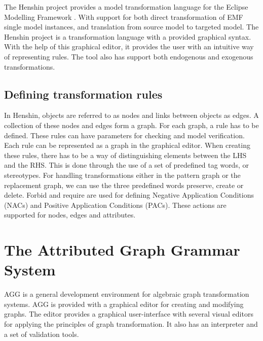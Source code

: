 \documentclass[pdftex,11pt,a4paper]{article}
\begin{document}
The Henshin project\cite{Henshin} provides a model transformation language for the Eclipse
Modelling Framework \cite{Steinberg2009}. With support for both direct 
transformation of EMF single model instances, and translation from source
model to targeted model. The Henshin project is a transformation language with a
provided graphical syntax. With the help of this graphical editor, it provides
the user with an intuitive way of representing rules. The tool also has support 
both endogenous and exogenous transformations.

\subsection{Defining transformation rules}

In Henshin, objects are referred to as nodes and links between objects as edges.
A collection of these nodes and edges form a graph. For each graph, a rule has
to be defined. These rules can have parameters for checking and model
verification. Each rule can be represented as a graph in the graphical
editor. \newline When creating these rules, there has to be a way of
distinguishing elements between the LHS and the RHS. This is done through the use of
a set of predefined tag words, or stereotypes. For handling transformations
either in the pattern graph or the replacement graph, we can use the three
predefined words preserve, create or delete. Forbid and require are used for
defining Negative Application Conditions (NACs) and Positive Application
Conditions (PACs). These actions are supported for nodes, edges and attributes.

\section{The Attributed Graph Grammar System}

AGG is a general development environment for algebraic graph transformation
systems. AGG is provided with a graphical editor for creating and modifying
graphs. The editor provides a graphical user-interface with several visual
editors for applying the principles of graph transformation. It also has an
interpreter and a set of validation tools.
\end{document}
